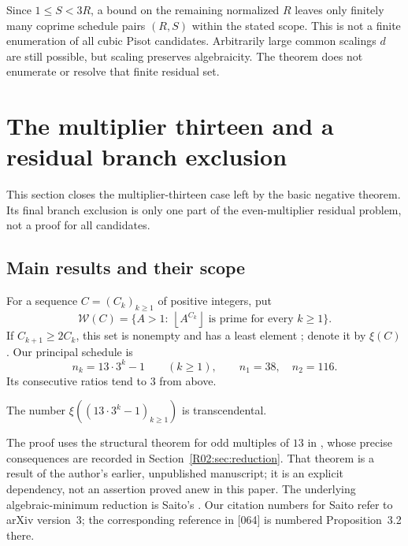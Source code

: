 \documentclass[11pt,a4paper]{article}
\theoremstyle{definition}\newtheorem{definition}[theorem]{Definition}
\theoremstyle{remark}\newtheorem{remark}[theorem]{Remark}
\newcommand{\floor}[1]{\left\lfloor#1\right\rfloor}
\begin{document}
Since $1\le S<3R$, a bound on the remaining normalized $R$ leaves
only finitely many coprime schedule pairs $(R,S)$ within the stated scope. This is not a finite enumeration of all cubic Pisot candidates. Arbitrarily large common
scalings $d$ are still possible, but scaling preserves algebraicity.
The theorem does not enumerate or resolve that finite residual set.



\endgroup

\section{The multiplier thirteen and a residual branch exclusion}\label{src:R02}
This section closes the multiplier-thirteen case left by the basic negative theorem. Its final branch exclusion is only one part of the even-multiplier residual problem, not a proof for all candidates.
\medskip
\begingroup



\subsection{Main results and their scope}

For a sequence $C=(C_k)_{k\ge1}$ of positive integers, put
\[
 \mathcal W(C)=\{A>1:\ \floor{A^{C_k}}\text{ is prime for every }k\ge1\}.
\]
If $C_{k+1}\ge2C_k$, this set is nonempty and has a least element
\cite[Theorem~1.3]{Saito}; denote it by $\xi(C)$.
Our principal schedule is
\begin{equation}\label{R02:eq:schedule}
 n_k=13\cdot3^k-1\qquad(k\ge1),
 \qquad n_1=38,\quad n_2=116.
\end{equation}
Its consecutive ratios tend to $3$ from above.

\begin{mainthm}\label{R02:thm:main}
The number $\xi((13\cdot3^k-1)_{k\ge1})$ is transcendental.
\end{mainthm}

The proof uses the structural theorem for odd multiples of $13$ in
\cite[Section~7.2, Theorem~\textup{\texttt{D13}}]{K064}, whose precise
consequences are recorded in Section~\ref{R02:sec:reduction}. That theorem
is a result of the author's earlier, unpublished manuscript; it is an
explicit dependency, not an assertion proved anew in this paper.
The underlying algebraic-minimum reduction is Saito's
\cite[Proposition~3.1]{Saito}. Our citation numbers for Saito refer to
arXiv version~3; the corresponding reference in [064] is numbered
Proposition~3.2 there.
\end{document}
